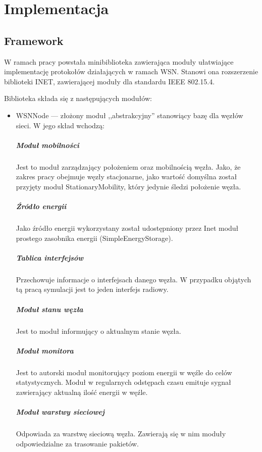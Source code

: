 \chapter{Implementacja}
\section{Framework}
W ramach pracy powstała minibiblioteka zawierająca moduły ułatwiające implementację protokołów działających w ramach WSN. Stanowi ona rozszerzenie biblioteki INET, zawierającej moduły dla standardu IEEE 802.15.4.

Biblioteka składa się z następujących modułów:
\begin{itemize}
	\item WSNNode --- złożony moduł ,,abstrakcyjny'' stanowiący bazę dla węzłów sieci. W jego skład wchodzą:
\paragraph{Moduł mobilności} Jest to moduł zarządzający położeniem oraz mobilnością węzła. Jako, że zakres pracy obejmuje węzły stacjonarne, jako wartość domyślna został przyjęty moduł StationaryMobility, który jedynie śledzi położenie węzła.
\paragraph{Źródło energii} Jako źródło energii wykorzystany został udostępniony przez Inet moduł prostego zasobnika energii (SimpleEnergyStorage).
\paragraph{Tablica interfejsów} Przechowuje informacje o interfejsach danego węzła. W przypadku objątych tą pracą symulacji jest to jeden interfejs radiowy.
\paragraph{Moduł stanu węzła} Jest to moduł informujący o aktualnym stanie węzła.
\paragraph{Moduł monitora} Jest to autorski moduł monitorujący poziom energii w węźle do celów statystycznych. Moduł w regularnych odstępach czasu emituje sygnał zawierający aktualną ilość energii w węźle.
\paragraph{Moduł warstwy sieciowej} Odpowiada za warstwę sieciową węzła. Zawierają się w nim moduły odpowiedzialne za trasowanie pakietów.

\end{itemize}
